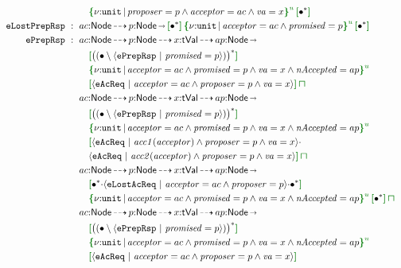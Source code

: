 {\begin{align*}
  \\ & \quad \urt{\Code{unit}}{\I{proposer}=p\land\I{acceptor}=ac\land\I{va}=x}\,\effL{} \allA \effR{}
  \\
  \eff{eLostPrepRsp} ~:~{}
  & ac{:}\mathsf{Node}\garr p{:}\mathsf{Node} \sarr \effL{} \allA \effR{}\,\urt{\Code{unit}}{\I{acceptor}=ac\land\I{promised}=p}\,\effL{} \allA \effR{}
  \\
  \eff{ePrepRsp} ~:~{}
  & ac{:}\mathsf{Node}\garr p{:}\mathsf{Node}\garr x{:}\mathsf{tVal}\garr ap{:}\mathsf{Node} \sarr 
  \\ & \quad \effL{} \SNegStar{\msg{ePrepRsp}{\I{promised}=p}} \effR{}\,
  \\ & \quad \urt{\Code{unit}}{\I{acceptor}=ac\land\I{promised}=p\land\I{va}=x\land\mathit{nAccepted}=ap}\,
  \\ & \quad \effL{} \msg{eAcReq}{\I{acceptor}=ac\land\I{proposer}=p\land\I{va}=x} \effR{} \interty
  \\
  & ac{:}\mathsf{Node}\garr p{:}\mathsf{Node}\garr x{:}\mathsf{tVal}\garr ap{:}\mathsf{Node} \sarr 
  \\ & \quad \effL{} \SNegStar{\msg{ePrepRsp}{\I{promised}=p}} \effR{}\,
  \\ & \quad \urt{\Code{unit}}{\I{acceptor}=ac\land\I{promised}=p\land\I{va}=x\land\mathit{nAccepted}=ap}\,{}
  \\ & \quad \effL{} \msg{eAcReq}{\mathit{acc1}(\I{acceptor})\land\I{proposer}=p\land\I{va}=x}\seqA
  \\ & \quad \msg{eAcReq}{\mathit{acc2}(\I{acceptor})\land\I{proposer}=p\land\I{va}=x} \effR{} \interty
  \\
  & ac{:}\mathsf{Node}\garr p{:}\mathsf{Node}\garr x{:}\mathsf{tVal}\garr ap{:}\mathsf{Node} \sarr 
  \\ & \quad \effL{} \allA\seqA\msg{eLostAcReq}{\I{acceptor}=ac\land\I{proposer}=p}\seqA\allA \effR{}\,
  \\ & \quad \urt{\Code{unit}}{\I{acceptor}=ac\land\I{promised}=p\land\I{va}=x\land\mathit{nAccepted}=ap}\,\effL{} \allA \effR{} \interty
  \\
  & ac{:}\mathsf{Node}\garr p{:}\mathsf{Node}\garr x{:}\mathsf{tVal}\garr ap{:}\mathsf{Node} \sarr 
  \\ & \quad \effL{} \SNegStar{\msg{ePrepRsp}{\I{promised}=p}} \effR{}\,
  \\ & \quad \urt{\Code{unit}}{\I{acceptor}=ac\land\I{promised}=p\land\I{va}=x\land\mathit{nAccepted}=ap}\,
  \\ & \quad \effL{} \msg{eAcReq}{\I{acceptor}=ac\land\I{proposer}=p\land\I{va}=x} \effR{}
\end{align*}}
\vspace{-.4cm}\par\nobreak\noindent

